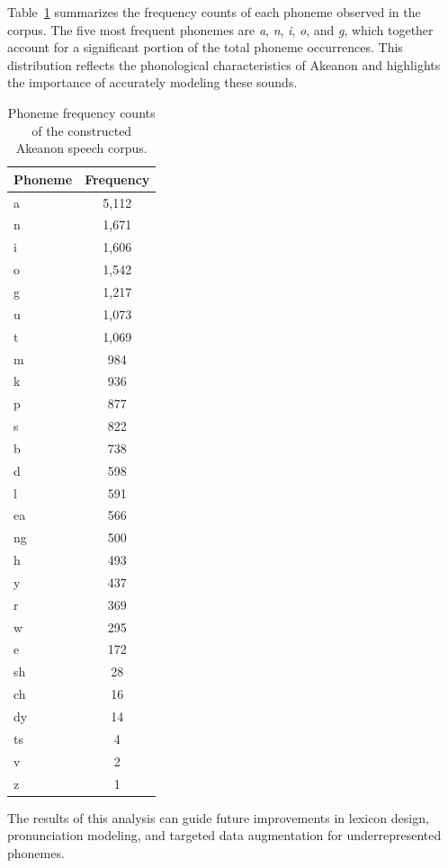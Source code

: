 Table~\ref{tab:phoneme-frequency} summarizes the frequency counts of each phoneme observed in the corpus. The five most frequent phonemes are \textit{a}, \textit{n}, \textit{i}, \textit{o}, and \textit{g}, which together account for a significant portion of the total phoneme occurrences. This distribution reflects the phonological characteristics of Akeanon and highlights the importance of accurately modeling these sounds.

\begin{table}[H]
	\centering
	\begin{tabular}{lc}
		\toprule
		\textbf{Phoneme} & \textbf{Frequency} \\
		\midrule
		a   & 5,112 \\
		n   & 1,671 \\
		i   & 1,606 \\
		o   & 1,542 \\
		g   & 1,217 \\
		u   & 1,073 \\
		t   & 1,069 \\
		m   & 984  \\
		k   & 936  \\
		p   & 877  \\
		s   & 822  \\
		b   & 738  \\
		d   & 598  \\
		l   & 591  \\
		ea  & 566  \\
		ng  & 500  \\
		h   & 493  \\
		y   & 437  \\
		r   & 369  \\
		w   & 295  \\
		e   & 172  \\
		sh  & 28   \\
		ch  & 16   \\
		dy  & 14   \\
		ts  & 4    \\
		v   & 2    \\
		z   & 1    \\
		\bottomrule
	\end{tabular}
	\caption{Phoneme frequency counts of the constructed Akeanon speech corpus.}
	\label{tab:phoneme-frequency}
\end{table}

The results of this analysis can guide future improvements in lexicon design, pronunciation modeling, and targeted data augmentation for underrepresented phonemes.

